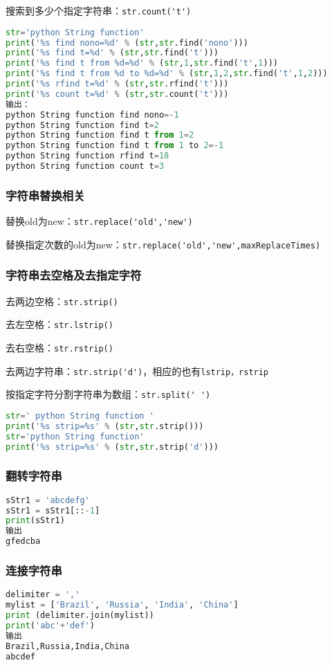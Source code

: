 搜索到多少个指定字符串：\verb|str.count('t')|

\begin{lstlisting}[language=python]
str='python String function'
print('%s find nono=%d' % (str,str.find('nono')))
print('%s find t=%d' % (str,str.find('t')))
print('%s find t from %d=%d' % (str,1,str.find('t',1)))
print('%s find t from %d to %d=%d' % (str,1,2,str.find('t',1,2)))
print('%s rfind t=%d' % (str,str.rfind('t')))
print('%s count t=%d' % (str,str.count('t')))
输出：
python String function find nono=-1
python String function find t=2
python String function find t from 1=2
python String function find t from 1 to 2=-1
python String function rfind t=18
python String function count t=3
\end{lstlisting}

\subsubsection{字符串替换相关}

替换old为new：\verb|str.replace('old','new')|

替换指定次数的old为new：\verb|str.replace('old','new',maxReplaceTimes)|


\subsubsection{字符串去空格及去指定字符}

去两边空格：\verb|str.strip()|

去左空格：\verb|str.lstrip()|

去右空格：\verb|str.rstrip()|

去两边字符串：\verb|str.strip('d')|，相应的也有\verb|lstrip，rstrip|

按指定字符分割字符串为数组：\verb|str.split(' ')|

\begin{lstlisting}[language=python]
str=' python String function '
print('%s strip=%s' % (str,str.strip()))
str='python String function'
print('%s strip=%s' % (str,str.strip('d')))
\end{lstlisting}



\subsubsection{翻转字符串}
\begin{lstlisting}[language=python]
sStr1 = 'abcdefg'
sStr1 = sStr1[::-1]
print(sStr1)
输出
gfedcba
\end{lstlisting}

\subsubsection{连接字符串}
\begin{lstlisting}[language=python]
delimiter = ','
mylist = ['Brazil', 'Russia', 'India', 'China']
print (delimiter.join(mylist))
print('abc'+'def')
输出
Brazil,Russia,India,China
abcdef
\end{lstlisting}
